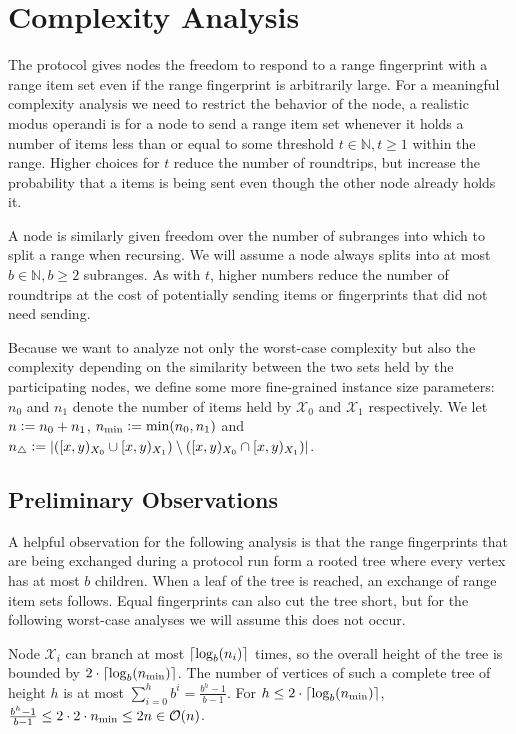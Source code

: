 \section{Complexity Analysis}
\label{set-reconciliation-complexity}

The protocol gives nodes the freedom to respond to a range fingerprint with a range item set even if the range fingerprint is arbitrarily large. For a meaningful complexity analysis we need to restrict the behavior of the node, a realistic modus operandi is for a node to send a range item set whenever it holds a number of items less than or equal to some threshold $t \in \mathbb{N}, t \geq 1$ within the range. Higher choices for $t$ reduce the number of roundtrips, but increase the probability that a items is being sent even though the other node already holds it.

A node is similarly given freedom over the number of subranges into which to split a range when recursing. We will assume a node always splits into at most $b \in \mathbb{N}, b \geq 2$ subranges. As with $t$, higher numbers reduce the number of roundtrips at the cost of potentially sending items or fingerprints that did not need sending.

Because we want to analyze not only the worst-case complexity but also the complexity depending on the similarity between the two sets held by the participating nodes, we define some more fine-grained instance size parameters: $n_0$ and $n_1$ denote the number of items held by $\mathcal{X}_0$ and $\mathcal{X}_1$ respectively. We let $n \vcentcolon= n_0 + n_1$, $n_{\min} \vcentcolon= \min(n_0, n_1)$ and $n_{\triangle} \vcentcolon= |{([{x},{y})_{X_0} \cup [{x},{y})_{X_1}) \setminus ([{x},{y})_{X_0} \cap [{x},{y})_{X_1})}|$.

\subsection{Preliminary Observations}

A helpful observation for the following analysis is that the range fingerprints that are being exchanged during a protocol run form a rooted tree where every vertex has at most $b$ children. When a leaf of the tree is reached, an exchange of range item sets follows. Equal fingerprints can also cut the tree short, but for the following worst-case analyses we will assume this does not occur.

Node $\mathcal{X}_i$ can branch at most $\lceil\log_{b}(n_i)\rceil$ times, so the overall height of the tree is bounded by $2 \cdot\lceil\log_{b}(n_{\min})\rceil$. The number of vertices of such a complete tree of height $h$ is at most $\sum_{i=0}^{h} b^{i} = \frac{b^{h} - 1}{b - 1}$. For $h \leq 2 \cdot\lceil\log_{b}(n_{\min})\rceil$, $\frac{b^{h} - 1}{b - 1} \leq 2 \cdot 2 \cdot n_{\min} \leq 2n \in \mathcal{O}(n)$.

